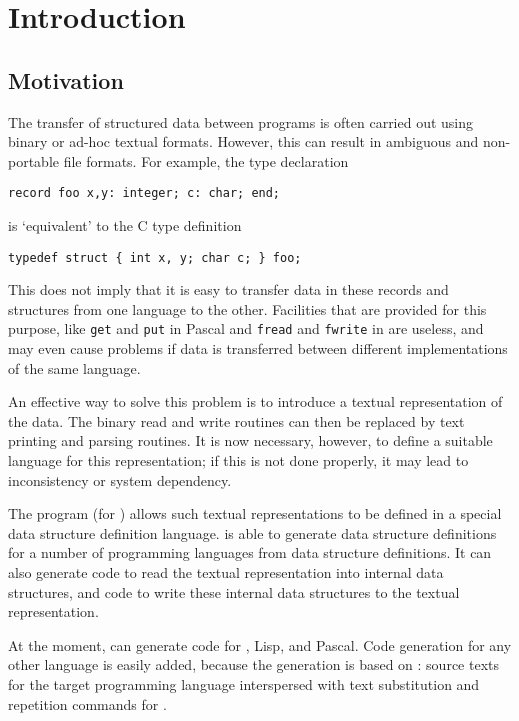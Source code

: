 \chapter{Introduction}
\label{s.intro}
\section{Motivation}
The transfer of structured data between programs is often carried out
using binary or ad-hoc textual formats.
However, this can result in ambiguous and non-portable file formats.
For example,
the {\Pascal} type declaration
\par
\begin{verbatim}
record foo x,y: integer; c: char; end;
\end{verbatim}
\par
is `equivalent' to the C type definition
\par
\begin{verbatim}
typedef struct { int x, y; char c; } foo;
\end{verbatim}
\par
This does not imply that it is easy to transfer data in these records
and structures from one language to the other.
Facilities that are provided for this purpose, like {\tt get} and
{\tt put} in Pascal and {\tt fread} and {\tt fwrite} in {\C} are useless,
and may even cause problems if data is transferred between different
implementations of the same language.
\par
An effective way to solve this problem is to introduce a textual
representation of the data.
The binary read and write routines can then be replaced by text printing and
parsing routines.
It is now necessary,
however, to define a suitable language for this representation;
if this is not done properly,
it may lead to inconsistency or system dependency.
\par
The program  (for ) allows such textual
representations to be defined in
a special data structure definition language.
{\Tm} is able to generate data structure definitions for a number of
programming languages from {\Tm} data structure definitions.
It can also generate code to read the textual representation into
internal data structures, and code to write these internal data structures
to the textual representation.
\par
At the moment, {\Tm} can generate code for {\C}, Lisp, {\Miranda} and Pascal.
Code generation for any other language is easily added,
because the generation is based on :
source texts for the target programming language
interspersed with text substitution and repetition commands for {\Tm}.

